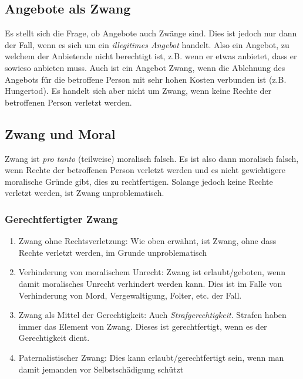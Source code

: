 \documentclass[../main.tex]{subfiles}
\begin{document}
\subsection{Angebote als Zwang}
Es stellt sich die Frage, ob Angebote auch Zwänge sind. Dies ist jedoch nur dann der Fall, wenn es sich um ein \textit{illegitimes Angebot} handelt. Also ein Angebot, zu welchem der Anbietende nicht berechtigt ist, z.B. wenn er etwas anbietet, dass er sowieso anbieten muss. Auch ist ein Angebot Zwang, wenn die Ablehnung des Angebots für die betroffene Person mit sehr hohen Kosten verbunden ist (z.B. Hungertod). Es handelt sich aber nicht um Zwang, wenn keine Rechte der betroffenen Person verletzt werden. 

 \subsection{Zwang und Moral}
 Zwang ist \textit{pro tanto} (teilweise) moralisch falsch. Es ist also dann moralisch falsch, wenn Rechte der betroffenen Person verletzt werden und es nicht gewichtigere moralische Gründe gibt, dies zu rechtfertigen. Solange jedoch keine Rechte verletzt werden, ist Zwang unproblematisch. 
 
 \subsubsection{Gerechtfertigter Zwang}
 \begin{enumerate}
 	\item Zwang ohne Rechtsverletzung: Wie oben erwähnt, ist Zwang, ohne dass Rechte verletzt werden, im Grunde unproblematisch
 	\item Verhinderung von moralischem Unrecht: Zwang ist erlaubt/geboten, wenn damit moralisches Unrecht verhindert werden kann. Dies ist im Falle von Verhinderung von Mord, Vergewaltigung, Folter, etc. der Fall.
 	\item Zwang als Mittel der Gerechtigkeit: Auch \textit{Strafgerechtigkeit}. Strafen haben immer das Element von Zwang. Dieses ist gerechtfertigt, wenn es der Gerechtigkeit dient.
 	\item Paternalistischer Zwang: Dies kann erlaubt/gerechtfertigt sein, wenn man damit jemanden vor Selbstschädigung schützt
 \end{enumerate}
\end{document}

